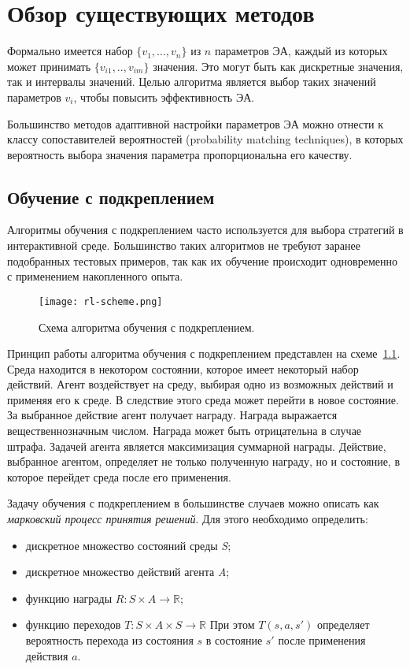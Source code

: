 \chapter{Обзор существующих методов}
\label{chapter_review}

Формально имеется набор $\{v_1, ..., v_n\}$ из $n$ параметров ЭА, каждый из которых может принимать $\{v_{i1}, .., v_{im}\}$ значения. Это могут быть как дискретные значения, так и интервалы значений. Целью алгоритма является выбор таких значений параметров $v_i$, чтобы повысить эффективность ЭА.

Большинство методов адаптивной настройки параметров ЭА можно отнести к классу сопоставителей вероятностей (probability matching techniques), в которых вероятность выбора значения параметра пропорциональна его качеству.

\section{Обучение с подкреплением}
\label{rl}
Алгоритмы обучения с подкреплением часто используется для выбора стратегий в интерактивной среде. Большинство таких алгоритмов не требуют заранее подобранных тестовых примеров, так как их обучение происходит одновременно с применением накопленного опыта.

\begin{figure}
    \centering
    \texttt{[image: rl-scheme.png]}
    \caption{Схема алгоритма обучения с подкреплением.}
    \label{rl_scheme}
\end{figure}

Принцип работы алгоритма обучения с подкреплением представлен на схеме~\ref{rl_scheme}. Среда находится в некотором состоянии, которое имеет некоторый набор действий. Агент воздействует на среду, выбирая одно из возможных действий и применяя его к среде. В следствие этого среда может перейти в новое состояние. За выбранное действие агент получает награду. Награда выражается вещественнозначным числом. Награда может быть отрицательна в случае штрафа. Задачей агента является максимизация суммарной награды. Действие, выбранное агентом, определяет не только полученную награду, но и состояние, в которое перейдет среда после его применения.

Задачу обучения с подкреплением в большинстве случаев можно описать как \textit{марковский процесс принятия решений}. Для этого необходимо определить:

\begin{itemize}
    \item дискретное множество состояний среды \textit{S};
    \item дискретное множество действий агента \textit{A};
    \item функцию награды $R : S \times A \rightarrow \mathbb{R}$;
    \item функцию переходов $T : S \times A \times S \rightarrow \mathbb{R}$ При этом $T(s, a, s')$ определяет вероятность перехода из состояния $s$ в состояние $s'$ после применения действия $a$.
\end{itemize}

